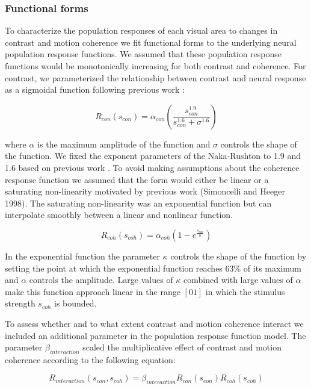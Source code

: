 \documentclass{report}
\begin{document}
\subsubsection{Functional forms}

To characterize the population responses of each visual area to changes in contrast and motion coherence we fit functional forms to the underlying neural population response functions. We assumed that these population response functions would be monotonically increasing for both contrast and coherence. For contrast, we parameterized the relationship between contrast and neural response as a sigmoidal function \citep{Naka1966-fh} following previous work \citep{Albrecht1982-rq}:

\begin{equation}
    R_{con}(s_{con})=\alpha_{con}(\frac{s_{con}^{1.9}}{s_{con}^{1.6}+\sigma^{1.6}})
\end{equation}

where $\alpha$ is the maximum amplitude of the function and $\sigma$ controls the shape of the function. We fixed the exponent parameters of the Naka-Rushton to 1.9 and 1.6 based on previous work \citep{Boynton1999-jd}.
To avoid making assumptions about the coherence response function we assumed that the form would either be linear or a saturating non-linearity motivated by previous work \citep{Rees2000-ul} (Simoncelli and Heeger 1998). The saturating non-linearity was an exponential function but can interpolate smoothly between a linear and nonlinear function.

\begin{equation}
R_{coh}(s_{coh})=\alpha_{coh} (1 - e^{\frac{s_{coh}}{\kappa}})
\end{equation}

In the exponential function the parameter $\kappa$ controls the shape of the function by setting the point at which the exponential function reaches 63\% of its maximum and $\alpha$ controls the amplitude. Large values of $\kappa$ combined with large values of $\alpha$ make this function approach linear in the range $[0 1]$ in which the stimulus strength $s_{coh}$ is bounded.

To assess whether and to what extent contrast and motion coherence interact we included an additional parameter in the population response function model. The parameter $\beta_{interaction}$ scaled the multiplicative effect of contrast and motion coherence according to the following equation:

\begin{equation}
    R_{interaction}(s_{con},s_{coh})=\beta_{interaction}R_{con}(s_{con})R_{coh}(s_{coh})
\end{equation}
\end{document}
